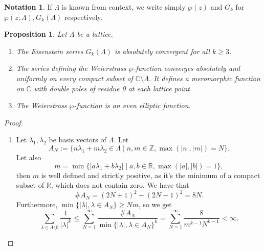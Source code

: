 \documentclass{article}
\newtheorem{proposition}[theorem]{Proposition}
\theoremstyle{definition}
\newtheorem*{notation}{Notation}
\theoremstyle{remark}
\newcommand{\C}{\mathbb{C}}
\newcommand{\R}{\mathbb{R}}
\newcommand{\Z}{\mathbb{Z}}
\begin{document}
\begin{notation}
	If $\Lambda$ is known from context, we write simply
	$\wp(z)$ and $G_k$ for $\wp(z; \Lambda), G_k(\Lambda)$
	respectively.
\end{notation}

\begin{proposition}
	Let $\Lambda$ be a lattice.
	\begin{enumerate}
		\item	The Eisenstein series $G_k(\Lambda)$ is absolutely convergent
			for all $k \geq 3$.
		\item The series defining the Weierstrass $\wp$-function converges
			absolutely and uniformly on every compact subset of
			$\C\setminus\Lambda$. It defines a meromorphic function on $\C$ with 
			double poles of residue 0 at each lattice point.
		\item The Weierstrass $\wp$-function is an even elliptic function.
	\end{enumerate}
\end{proposition}

\begin{proof}
	\begin{enumerate}
	\item	Let $\lambda_1, \lambda_2$ be basis vectors of $\Lambda$.
		Let 
		\begin{equation*}
			A_N := \{n\lambda_1 + m\lambda_2 \in \Lambda \mid
			n, m \in \Z, \max(|n|, |m|) = N\}.
		\end{equation*}
		Let also 
		\begin{equation*}
			m = \min\{|a\lambda_1 + b\lambda_2| \mid 
			a, b \in \R, \max(|a|,|b|) = 1\},
		\end{equation*}
		then $m$ is well defined and strictly positive,
		as it's the minimum of a compact subset of $\R$, which does
		not contain zero. We have that
		\begin{equation*}
			\#A_N = (2N + 1)^2 - (2N - 1)^2 = 8N.
		\end{equation*}
		Furthermore, $\min\{|\lambda|, \lambda \in A_N\} \geq Nm$, so we
		get
		\begin{equation*}
			\sum_{\lambda \in \Lambda\setminus 0}\frac{1}{|\lambda|^k}
			\leq \sum_{N=1}^\infty \frac{\#A_N}{\min\{|\lambda|, \lambda \in
			A_N\}^k}
			= \sum_{N=1}^{\infty} \frac{8}{m^{k-1}N^{k-1}} < \infty.
		\end{equation*}

	\end{enumerate}
\end{proof}
\end{document}
